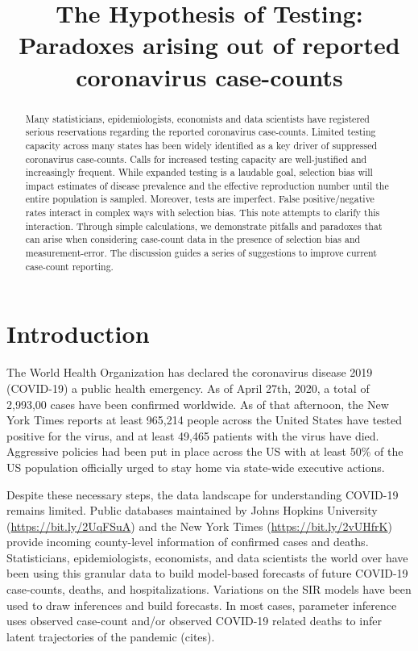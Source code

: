\documentclass[11pt]{amsart}
\begin{document}
\title{The Hypothesis of Testing: Paradoxes arising out of reported coronavirus case-counts}
\maketitle

\begin{abstract}
Many statisticians, epidemiologists, economists and data scientists have registered serious reservations regarding the reported coronavirus case-counts. Limited testing capacity across many states has been widely identified as a key driver of suppressed coronavirus case-counts.  Calls for increased testing capacity are well-justified and increasingly frequent.  While expanded testing is a laudable goal, selection bias will impact estimates of disease prevalence and the effective reproduction number until the entire population is sampled.  Moreover, tests are imperfect.  False positive/negative rates interact in complex ways with selection bias.  This note attempts to clarify this interaction.  Through simple calculations, we demonstrate pitfalls and paradoxes that can arise when considering case-count data in the presence of selection bias and measurement-error. The discussion guides a series of suggestions to improve current case-count reporting.
\end{abstract}

\section{Introduction}
The World Health Organization has declared the coronavirus disease 2019 (COVID-19) a public health emergency.  As of April 27th, 2020, a total of 2,993,00 cases have been confirmed worldwide.  As of that afternoon, the New York Times reports at least 965,214 people across the United States have tested positive for the virus, and at least 49,465 patients with the virus have died.  Aggressive policies had been put in place across the US with at least 50\% of the US population officially urged to stay home via state-wide executive actions.

Despite these necessary steps, the data landscape for understanding COVID-19 remains limited.  Public databases maintained by Johns Hopkins University (\url{https://bit.ly/2UqFSuA}) and the New York Times (\url{https://bit.ly/2vUHfrK}) provide incoming county-level information of confirmed cases and deaths.  Statisticians, epidemiologists, economists, and data scientists the world over have been using this granular data to build model-based forecasts of future COVID-19 case-counts, deaths, and hospitalizations.  Variations on the SIR models have been used to draw inferences and build forecasts.  In most cases, parameter inference uses observed case-count and/or observed COVID-19 related deaths to infer latent trajectories of the pandemic (cites).
\end{document}
